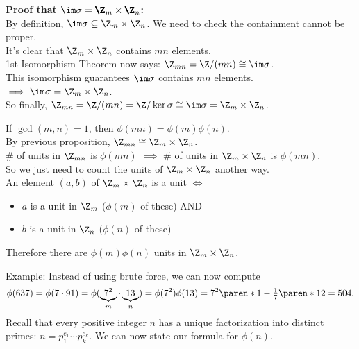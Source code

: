 \textbf{Proof that $\im\sigma=\pmb\Z_m\times\pmb\Z_n$:} \\
By definition, $\im\sigma\subseteq\Z_m\times\Z_n$.  We need to check the containment cannot be proper. \\
It's clear that $\Z_m\times\Z_n$ contains $mn$ elements. \\
1st Isomorphism Theorem now says: $\Z_{mn}=\Z/(mn)\cong\im\sigma$. \\
This isomorphism guarantees $\im\sigma$ contains $mn$ elements. \\
$\implies\im\sigma=\Z_m\times\Z_n$. \\
So finally, $\Z_{mn}=\Z/(mn)=\Z/\ker\sigma\cong\im\sigma=\Z_m\times\Z_n$.

\cor If $\gcd(m,n)=1$, then $\phi(mn)=\phi(m)\phi(n)$. \\
\pf By previous proposition, $\Z_{mn}\cong\Z_m\times\Z_n$. \\
\# of units in $\Z_{mn}$ is $\phi(mn)$ $\implies$ \# of units in $\Z_m\times\Z_n$ is $\phi(mn)$. \\
So we just need to count the units of $\Z_m\times\Z_n$ another way. \\
An element $(a,b)$ of $\Z_m\times\Z_n$ is a unit $\iff$
\begin{itemize}
\item $a$ is a unit in $\Z_m$ ($\phi(m)$ of these) AND
\item $b$ is a unit in $\Z_n$ ($\phi(n)$ of these)
\end{itemize}
Therefore there are $\phi(m)\phi(n)$ units in $\Z_m\times\Z_n$.

Example: Instead of using brute force, we can now compute
\[ \phi(637) = \phi(7\cdot91) = \phi(\underbrace{7^2}_m\cdot\underbrace{13}_n) = \phi(7^2)\phi(13) = 7^2\paren*{1-\tfrac17}\paren*{12} = 504 . \]
Recall that every positive integer $n$ has a unique factorization into distinct primes: $n=p_1^{e_1}\dotsm p_k^{e_k}$.  We can now state our formula for $\phi(n)$.


